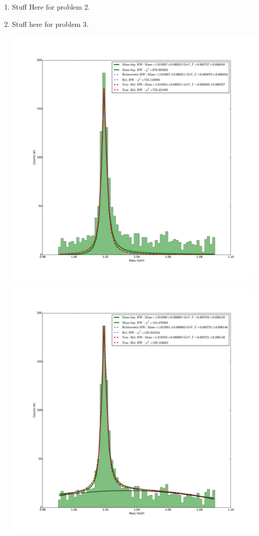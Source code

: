 \documentclass[pdftex]{article}
\begin{document}
\begin{enumerate}
	\pagebreak
	\item Stuff Here for problem 2.
	\item Stuff here for problem 3.
	\begin{center}
		\includegraphics[scale=0.35]{Problem_3_nobackfit.pdf}
	\end{center}
	\begin{center}
		\includegraphics[scale=0.35]{Problem_3_withbackfit.pdf}
	\end{center}

\end{enumerate}
\end{document}
